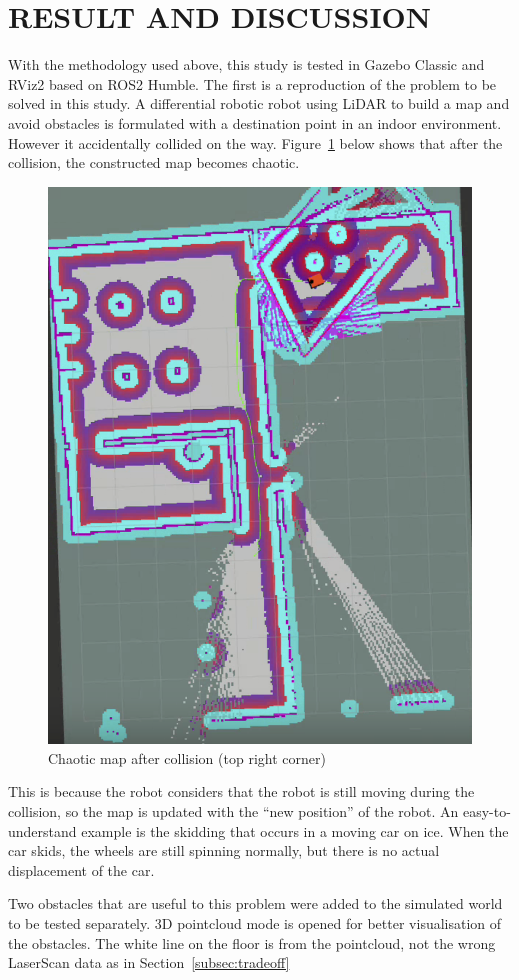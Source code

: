 \section{RESULT AND DISCUSSION}
\label{sec:result_and_discussion}
With the methodology used above, this study is tested in Gazebo Classic and RViz2 based on ROS2 Humble. 
The first is a reproduction of the problem to be solved in this study.
A differential robotic robot using LiDAR to build a map and avoid obstacles is formulated 
with a destination point in an indoor environment. However it accidentally collided on the way. 
Figure~\ref{fig:collision} below shows that after the collision, the constructed map becomes chaotic.
\begin{figure}[H]
    \centering
    \includegraphics[width=0.4\linewidth]{figs/chaotic_map.png}
    \caption{Chaotic map after collision (top right corner)}
    \label{fig:collision}
\end{figure}
This is because the robot considers that the robot is still moving during the collision,
so the map is updated with the ``new position'' of the robot. An easy-to-understand example is the skidding that occurs in a moving car on ice. 
When the car skids, the wheels are still spinning normally, but there is no actual displacement of the car.

Two obstacles that are useful to this problem were added to the simulated world to be tested separately.
3D pointcloud mode is opened for better visualisation of the obstacles. 
The white line on the floor is from the pointcloud, not the wrong LaserScan data as in Section~\ref{subsec:tradeoff}

